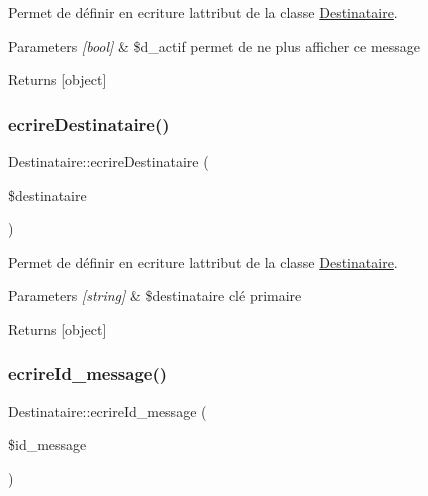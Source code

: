 Permet de définir en ecriture l\textquotesingle{}attribut de la classe \hyperlink{class_destinataire}{Destinataire}. 


\begin{DoxyParams}{Parameters}
{\em \mbox{[}bool\mbox{]}} & \$d\+\_\+actif permet de ne plus afficher ce message \\
\hline
\end{DoxyParams}
\begin{DoxyReturn}{Returns}
\mbox{[}object\mbox{]} 
\end{DoxyReturn}
\mbox{\label{class_destinataire_a8db62fe26d37f538b991e2f28283245b}} 
\subsubsection{\texorpdfstring{ecrire\+Destinataire()}{ecrireDestinataire()}}
{\footnotesize\ttfamily Destinataire\+::ecrire\+Destinataire (\begin{DoxyParamCaption}\item[{}]{\$destinataire }\end{DoxyParamCaption})}



Permet de définir en ecriture l\textquotesingle{}attribut de la classe \hyperlink{class_destinataire}{Destinataire}. 


\begin{DoxyParams}{Parameters}
{\em \mbox{[}string\mbox{]}} & \$destinataire clé primaire \\
\hline
\end{DoxyParams}
\begin{DoxyReturn}{Returns}
\mbox{[}object\mbox{]} 
\end{DoxyReturn}
\mbox{\label{class_destinataire_a82b89e128381c85b4da25060e3a01630}} 
\subsubsection{\texorpdfstring{ecrire\+Id\+\_\+message()}{ecrireId\_message()}}
{\footnotesize\ttfamily Destinataire\+::ecrire\+Id\+\_\+message (\begin{DoxyParamCaption}\item[{}]{\$id\+\_\+message }\end{DoxyParamCaption})}



